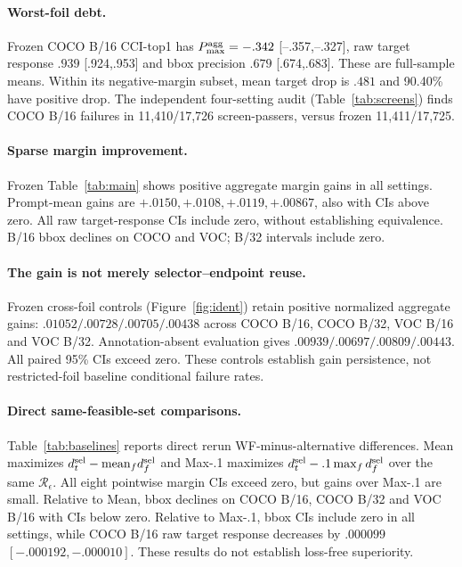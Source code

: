 \documentclass[10pt]{article}
\newcommand{\regions}{\mathcal{R}}
\begin{document}
\paragraph{Worst-foil debt.}
Frozen COCO B/16 CCI-top1 has $P_{\max}^{\rm agg}=-.342$ [--.357,--.327],
raw target response $.939$ [.924,.953] and bbox precision $.679$ [.674,.683].
These are full-sample means. Within its negative-margin subset, mean target
drop is $.481$ and 90.40\% have positive drop. The independent four-setting
audit (Table~\ref{tab:screens}) finds COCO B/16 failures in 11,410/17,726
screen-passers, versus frozen 11,411/17,725.

\paragraph{Sparse margin improvement.}
Frozen Table~\ref{tab:main} shows positive aggregate margin gains in all
settings. Prompt-mean gains are $+.0150,+.0108,+.0119,+.00867$, also with
CIs above zero. All raw target-response CIs include zero, without establishing
equivalence. B/16 bbox declines on COCO and VOC; B/32 intervals include zero.

\paragraph{The gain is not merely selector--endpoint reuse.}
Frozen cross-foil controls (Figure~\ref{fig:ident}) retain positive normalized
aggregate gains: $.01052/.00728/.00705/.00438$ across COCO B/16, COCO B/32,
VOC B/16 and VOC B/32. Annotation-absent evaluation gives
$.00939/.00697/.00809/.00443$. All paired 95\% CIs exceed zero.
These controls establish gain persistence, not restricted-foil baseline
conditional failure rates.

\paragraph{Direct same-feasible-set comparisons.}
Table~\ref{tab:baselines} reports direct rerun WF-minus-alternative differences.
Mean maximizes $d_t^{\rm sel}-\mathrm{mean}_f d_f^{\rm sel}$ and Max-.1 maximizes
$d_t^{\rm sel}-.1\max_f d_f^{\rm sel}$ over the same $\regions_\epsilon$.
All eight pointwise margin CIs exceed zero, but gains over Max-.1 are small.
Relative to Mean, bbox declines on COCO B/16, COCO B/32 and VOC B/16 with
CIs below zero. Relative to Max-.1, bbox CIs include zero in all settings,
while COCO B/16 raw target response decreases by $.000099$
$[-.000192,-.000010]$. These results do not establish loss-free superiority.
\end{document}
